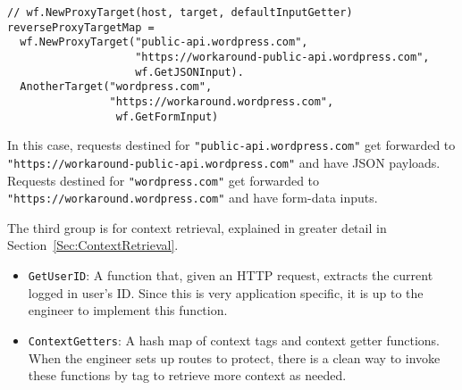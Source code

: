 \begin{lstlisting}
// wf.NewProxyTarget(host, target, defaultInputGetter)
reverseProxyTargetMap = 
  wf.NewProxyTarget("public-api.wordpress.com", 
                    "https://workaround-public-api.wordpress.com", 
                    wf.GetJSONInput).
  AnotherTarget("wordpress.com", 
                "https://workaround.wordpress.com",
                 wf.GetFormInput)
\end{lstlisting}

In this case, requests destined for \lstinline{"public-api.wordpress.com"} get forwarded to \\ \lstinline{"https://workaround-public-api.wordpress.com"} and have JSON payloads. Requests destined for \lstinline{"wordpress.com"} get forwarded to \lstinline{"https://workaround.wordpress.com"} and have form-data inputs. 

\iffalse
The \lstinline{FrontendAddress} should naturally be set to the

The \lstinline{ReverseProxyTargetMap} is a hash map of hosts and targets, along with their respective default input getters described in Section~\ref{Sec:DefaultInputGetters}. This field tells the firewall to catch requests of a given \lstinline{host} and forward it to a specific \lstinline{target}. There are separate default input getters since requests going to different hosts may have different representations of their payloads. The following is the \lstinline{ReverseProxyTargetMap} from the firewall configuration for Calypso:

The \lstinline{ReverseProxyAddress} should be set to the address where the firewall should attach itself and listen on.
\fi

\noindent The third group is for context retrieval, explained in greater detail in Section~\ref{Sec:ContextRetrieval}. 

\begin{itemize}[nosep]
\item \lstinline{GetUserID}: A function that, given an HTTP request, extracts the current logged in user's ID. Since this is very application specific, it is up to the engineer to implement this function.

\item \lstinline{ContextGetters}: A hash map of context tags and context getter functions. When the engineer sets up routes to protect, there is a clean way to invoke these functions by tag to retrieve more context as needed.
\end{itemize}


